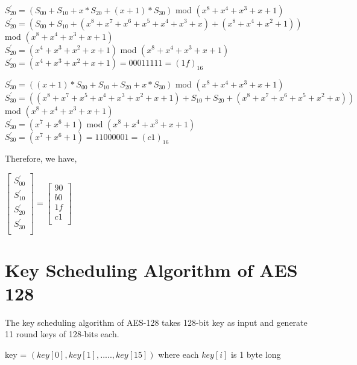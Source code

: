 \documentclass[11pt]{article}
\begin{document}
\begin{center}
    $S_{20}^{'} = (S_{00} + S_{10} + x * S_{20} + (x+1) * S_{30})$ mod $(x^8 + x^4 + x^3 + x + 1)$\\
    \vspace{1mm}
    $S_{20}^{'} = (S_{00} + S_{10} + (x^8 + x^7 + x^6 + x^5 + x^4 + x^3 + x) + (x^8 + x^4 + x^2 + 1))$ mod $(x^8 + x^4 + x^3 + x + 1)$\\
    \vspace{1mm}
    $S_{20}^{'} = (x^4 + x^3 + x^2 + x + 1)$ mod $(x^8 + x^4 + x^3 + x + 1)$\\
    \vspace{1mm}
    $S_{20}^{'} = (x^4 + x^3 + x^2 + x + 1) = 00011111 = (1f)_{16}$
\end{center}

\begin{center}
    $S_{30}^{'} = ((x+1) * S_{00} + S_{10} + S_{20} + x * S_{30})$ mod $(x^8 + x^4 + x^3 + x + 1)$\\
    \vspace{1mm}
    $S_{30}^{'} = ((x^8 + x^7 + x^5 + x^4 + x^3 + x^2 + x + 1) + S_{10} + S_{20} + (x^8 + x^7 + x^6 + x^5 + x^2 + x))$ mod $(x^8 + x^4 + x^3 + x + 1)$\\
    \vspace{1mm}
    $S_{30}^{'} = (x^7 + x^6 + 1)$ mod $(x^8 + x^4 + x^3 + x + 1)$\\
    \vspace{1mm}
    $S_{30}^{'} = (x^7 + x^6 + 1) = 11000001 = (c1)_{16}$
\end{center}
Therefore, we have,
\begin{center}
    $
    \begin{bmatrix}
        S_{00}^{'}\\
        S_{10}^{'}\\
        S_{20}^{'}\\
        S_{30}^{'}\\
    \end{bmatrix}
    =
    \begin{bmatrix}
        90\\
        b0\\
        1f\\
        c1\\
    \end{bmatrix}
    $
\end{center}

\section{Key Scheduling Algorithm of AES 128}
The key scheduling algorithm of AES-128 takes 128-bit key as input and generate 11 round keys of 128-bits each.
\begin{center}
    key = $(key[0], key[1],....., key[15])$ where each $key[i]$ is 1 byte long
\end{center}
\end{document}
